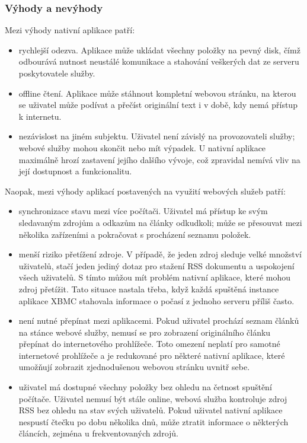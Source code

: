\subsubsection{Výhody a nevýhody}

Mezi výhody nativní aplikace patří:
\begin{itemize}
    \item rychlejší odezva.
        Aplikace může ukládat všechny položky na pevný disk, čímž odbourává nutnost neustálé komunikace a stahování veškerých dat ze serveru poskytovatele služby.
    \item offline čtení.
        Aplikace může stáhnout kompletní webovou stránku, na kterou se uživatel může podívat a přečíst originální text i v době, kdy nemá přístup k internetu.
    \item nezávislost na jiném subjektu.
        Uživatel není závislý na provozovateli služby; webové služby mohou skončit nebo mít výpadek.
        U nativní aplikace maximálně hrozí zastavení jejího dalšího vývoje, což zpravidal nemívá vliv na její dostupnost a funkcionalitu.
\end{itemize}

Naopak, mezi výhody aplikací postavených na využití webových služeb patří:
\begin{itemize}
    \item synchronizace stavu mezi více počítači.
        Uživatel má přístup ke svým sledavaným zdrojům a odkazům na články odkudkoli; může se přesouvat mezi několika zařízeními a pokračovat s procházení seznamu položek.
    \item menší riziko přetížení zdroje.
        V případě, že jeden zdroj sleduje velké množství uživatelů, stačí jeden jediný dotaz pro stažení RSS dokumentu a uspokojení všech uživatelů.
        S tímto můžou mít problém nativní aplikace, které mohou zdroj přetížit.
        Tato situace nastala třeba, když každá spuštěná instance aplikace XBMC stahovala informace o počasí z jednoho serveru příliš často.
    \item není nutné přepínat mezi aplikacemi.
        Pokud uživatel prochází seznam článků na stánce webové služby, nemusí se pro zobrazení originálního článku přepínat do internetového prohlížeče.
        Toto omezení neplatí pro samotné internetové prohlížeče a je redukované pro některé nativní aplikace, které umožňují zobrazit zjednodušenou webovou stránku uvnitř sebe.
    \item uživatel má dostupné všechny položky bez ohledu na četnost spuštění počítače.
        Uživatel nemusí být stále online, webová služba kontroluje zdroj RSS bez ohledu na stav svých uživatelů.
        Pokud uživatel nativní aplikace nespustí čtečku po dobu několika dnů, může ztratit informace o některých článcích, zejména u frekventovaných zdrojů.
\end{itemize}

